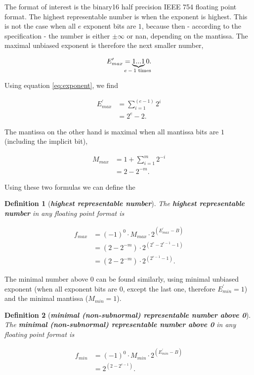 \documentclass{article}
\theoremstyle{plain} %
\newtheorem{definition}{Definition}[section]
\theoremstyle{convention} %
\theoremstyle{remark} %
\def\df#1{\textbf{\textit{#1}}}
\numberwithin{equation}{section}
\begin{document}
The format of interest is the \gls{binary16} half precision IEEE 754 floating point format. The highest representable number is when the exponent is highest. This is not the case when all $e$ exponent bits are $1$, because then - according to the specification \cite{ieee754_1985} - the number is either $\pm \infty$ or \acrfull{nan}, depending on the mantissa. The maximal unbiased exponent is therefore the next smaller number,

\begin{align*}
    E^{\prime}_{max} = \underbrace{ 1...1 }_{\text{\makebox[0pt]{$e-1$ times} }}0.
\end{align*}

Using equation \eqref{eq:exponent}, we find

\begin{align*}
    E^{\prime}_{max} &= \sum_{i=1}^{(e-1)} 2^i \\
            &= 2^e -2.
\end{align*}

The mantissa on the other hand is maximal when all mantissa bits are $1$ (including the implicit bit),

\begin{align*}
    M_{max} &= 1 + \sum_{i=1}^{m} 2^{-i} \\
            &= 2 - 2^{-m}.
\end{align*}

Using these two formulas we can define the

\begin{definition}[\df{highest representable number}]

The \df{highest representable number} in any floating point format is

\begin{align*}
    f_{max} &= (-1)^0 \cdot M_{max} \cdot 2^{(E^{\prime}_{max} - B)} \\
            &= ( 2 - 2^{-m} ) \cdot 2^{(2^e -2^{e-1} -1)} \\
            &= ( 2 - 2^{-m} ) \cdot 2^{(2^{e-1} -1)}.
\end{align*}

\end{definition}

The minimal number above \num{0} can be found similarly, using minimal unbiased exponent (when all exponent bits are \num{0}, except the last one, therefore $E^{\prime}_{min} = 1$) and the minimal mantissa ($M_{min} = 1$).

\begin{definition}[\df{minimal (non-subnormal) representable number above \num{0}}]

The \df{minimal (non-subnormal) representable number above \num{0}} in any floating point format is

\begin{align*}
    f_{min} &= (-1)^0 \cdot M_{min} \cdot 2^{(E^{\prime}_{min} - B)} \\
            &= 2^{(2 - 2^{e-1})}.
\end{align*}

\end{definition}
\end{document}
